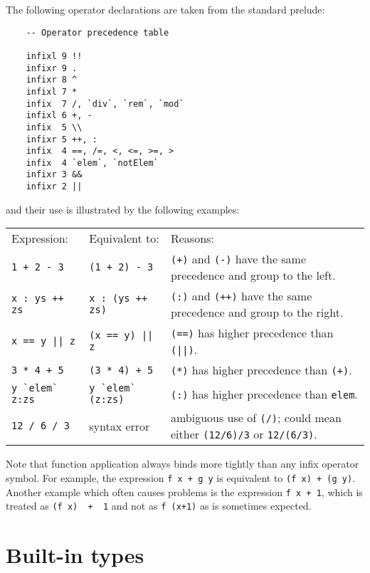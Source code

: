 The following operator declarations are taken from the standard prelude:
\begin{verbatim}
    -- Operator precedence table

    infixl 9 !!
    infixr 9 .
    infixr 8 ^
    infixl 7 *
    infix  7 /, `div`, `rem`, `mod`
    infixl 6 +, -
    infix  5 \\
    infixr 5 ++, :
    infix  4 ==, /=, <, <=, >=, >
    infix  4 `elem`, `notElem`
    infixr 3 &&
    infixr 2 ||
\end{verbatim}
and their use is illustrated by the following examples:
\BQ
\begin{tabular}{llp{6cm}}
 Expression: &    Equivalent to: &  Reasons:   \\
 \verb"1 + 2 - 3" & \verb"(1 + 2) - 3"  &  \verb"(+)" and \verb"(-)"
                                           have the same  precedence
                                           and group to the left. \\
 \verb"x : ys ++ zs" &  \verb"x : (ys ++ zs)" &   \verb"(:)" and 
                                           \verb"(++)" have the same precedence
                                           and group to the right.\\
 \verb"x == y || z" & \verb"(x == y) || z" &    \verb"(==)" has higher
                                            precedence than \verb"(||)".\\
 \verb"3 * 4 + 5" & \verb"(3 * 4) + 5" &   \verb"(*)" has higher 
                                           precedence than \verb"(+)".\\
 \verb"y `elem` z:zs" & \verb"y `elem` (z:zs)" & \verb"(:)"  has higher 
                                          precedence than \verb"elem". \\
 \verb"12 / 6 / 3" & syntax error &    ambiguous  use  of  \verb"(/)";
                                      could  mean
                                  either \verb"(12/6)/3" or \verb"12/(6/3)".
\end{tabular}
\EQ
Note that function application always binds more tightly than any infix
operator symbol.  For example, the expression \verb"f x + g y" is equivalent
to \verb"(f x) + (g y)".  Another example which often causes problems is the
expression  \verb"f x + 1", 
which is treated as \verb"(f x)  +  1"  and  not  as
\verb"f (x+1)" as is sometimes expected.


\chapter{Built-in types}

